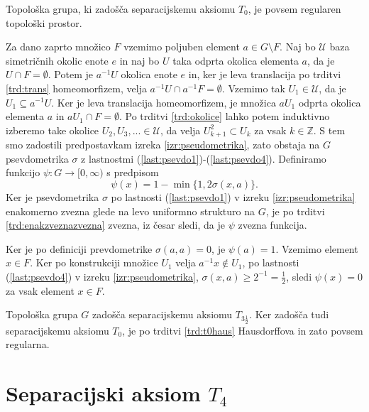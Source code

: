 \documentclass[mat1]{fmfdelo}
\newcommand{\Z}{\mathbb Z}
\newcommand{\Ucurl}{\mathcal{U}}
\begin{document}
\begin{izrek}\label{izr:t3pol}
	Topološka grupa, ki zadošča separacijskemu aksiomu $T_0$, je povsem regularen topološki prostor.
\end{izrek}

\begin{dokaz}
Za dano zaprto množico $F$ vzemimo poljuben element $a \in G\setminus F$.
Naj bo $\Ucurl$ baza simetričnih okolic enote $e$ in naj bo $U$ taka odprta okolica elementa $a$, da je $U \cap F = \emptyset$. Potem je $a^{-1}U$ okolica enote $e$ in, ker je leva translacija po trditvi \ref{trd:trans} homeomorfizem, velja $a^{-1}U \cap a^{-1}F = \emptyset$. Vzemimo tak $U_1 \in \Ucurl$, da je $U_1 \subseteq a^{-1}U$. Ker je leva translacija homeomorfizem, je množica $aU_1$ odprta okolica elementa $a$ in $aU_1 \cap F = \emptyset$. Po trditvi \ref{trd:okolice} lahko potem induktivno izberemo take okolice $U_2, U_3,... \in \Ucurl$, da velja $U_{k+1}^2 \subset U_k$ za vsak $k \in \Z$. S tem smo zadostili predpostavkam izreka \ref{izr:pseudometrika}, zato obstaja na $G$ psevdometrika $\sigma$ z lastnostmi (\ref{last:psevdo1})-(\ref{last:psevdo4}). Definiramo funkcijo $\psi\colon G \to [0, \infty)$ s predpisom
\[ \psi(x) = 1 - \min\lbrace 1, 2\sigma(x, a)\rbrace. \]
Ker je psevdometrika $\sigma$ po lastnosti (\ref{last:psevdo1}) v izreku \ref{izr:pseudometrika} enakomerno zvezna glede na levo uniformno strukturo na $G$, je po trditvi \ref{trd:enakzveznazvezna} zvezna, iz česar sledi, da je $\psi$ zvezna funkcija.

Ker je po definiciji prevdometrike $\sigma(a, a) = 0$, je $\psi(a) = 1$.
Vzemimo element $x \in F$. Ker po konstrukciji množice $U_1$ velja $a^{-1}x \notin U_1$, po lastnosti (\ref{last:psevdo4}) v izreku \ref{izr:pseudometrika}, $\sigma(x, a) \geq 2^{-1} = \frac{1}{2}$, sledi $\psi(x) = 0$ za vsak element $x \in F$.

Topološka grupa $G$ zadošča separacijskemu aksiomu $T_{3\frac{1}{2}}$. Ker zadošča tudi separacijskemu aksiomu $T_0$, je po trditvi \ref{trd:t0haus} Hausdorffova in zato povsem regularna.
\end{dokaz}

\section{Separacijski aksiom $T_4$}
\end{document}
